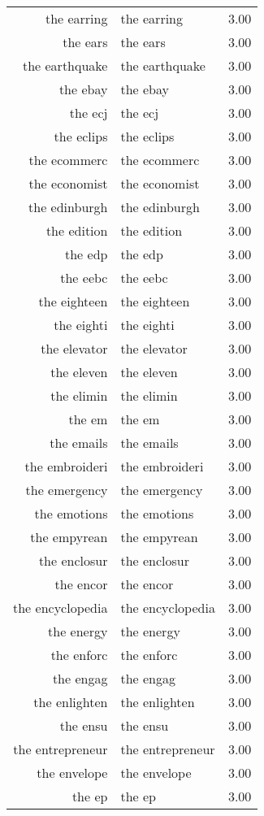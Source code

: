 \begin{table}[ht]
\begin{tabular}{rlr}
  the earring & the earring & 3.00 \\ 
  the ears & the ears & 3.00 \\ 
  the earthquake & the earthquake & 3.00 \\ 
  the ebay & the ebay & 3.00 \\ 
  the ecj & the ecj & 3.00 \\ 
  the eclips & the eclips & 3.00 \\ 
  the ecommerc & the ecommerc & 3.00 \\ 
  the economist & the economist & 3.00 \\ 
  the edinburgh & the edinburgh & 3.00 \\ 
  the edition & the edition & 3.00 \\ 
  the edp & the edp & 3.00 \\ 
  the eebc & the eebc & 3.00 \\ 
  the eighteen & the eighteen & 3.00 \\ 
  the eighti & the eighti & 3.00 \\ 
  the elevator & the elevator & 3.00 \\ 
  the eleven & the eleven & 3.00 \\ 
  the elimin & the elimin & 3.00 \\ 
  the em & the em & 3.00 \\ 
  the emails & the emails & 3.00 \\ 
  the embroideri & the embroideri & 3.00 \\ 
  the emergency & the emergency & 3.00 \\ 
  the emotions & the emotions & 3.00 \\ 
  the empyrean & the empyrean & 3.00 \\ 
  the enclosur & the enclosur & 3.00 \\ 
  the encor & the encor & 3.00 \\ 
  the encyclopedia & the encyclopedia & 3.00 \\ 
  the energy & the energy & 3.00 \\ 
  the enforc & the enforc & 3.00 \\ 
  the engag & the engag & 3.00 \\ 
  the enlighten & the enlighten & 3.00 \\ 
  the ensu & the ensu & 3.00 \\ 
  the entrepreneur & the entrepreneur & 3.00 \\ 
  the envelope & the envelope & 3.00 \\ 
  the ep & the ep & 3.00 \\ 

\end{tabular}
\end{table}
